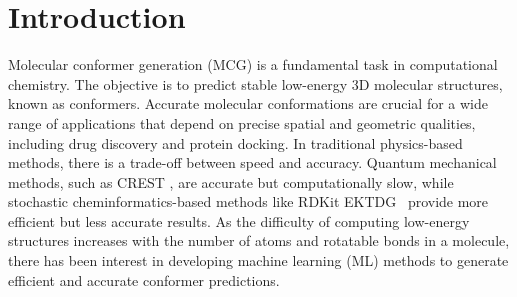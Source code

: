 \section{Introduction}
\vspace{-1ex}

Molecular conformer generation (MCG) is a fundamental task in computational chemistry. The objective is to predict stable low-energy 3D molecular structures, known as conformers. 
Accurate molecular conformations are crucial for a wide range of applications that depend on precise spatial and geometric qualities, including drug discovery and protein docking.
In traditional physics-based methods, there is a trade-off between speed and accuracy. Quantum mechanical methods, such as CREST \citep{CREST}, are accurate but computationally slow, while stochastic cheminformatics-based methods like RDKit EKTDG~\citep{rdkit} provide more efficient but less accurate results.
As the difficulty of computing low-energy structures increases with the number of atoms and rotatable bonds in a molecule, there has been interest in developing machine learning (ML) methods to generate efficient and accurate conformer predictions.

